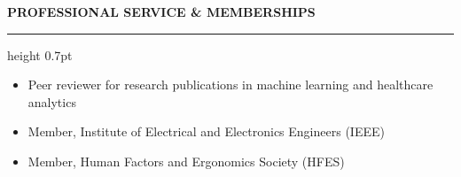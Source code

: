 \documentclass[11pt,letterpaper]{article}
\newcommand{\cvsection}[1]{%
  \vspace{0.7em}%
  {\color{headerblue}\large\bfseries\MakeUppercase{#1}}%
  \vspace{0.12em}%
  {\color{rulecolor}\hrule height 0.7pt}%
  \vspace{0.35em}%
}
\begin{document}
\cvsection{Professional Service \& Memberships}

\begin{itemize}[leftmargin=0.5cm, itemsep=0.05cm, topsep=0.06cm, label={\color{headerblue}\textbullet}]
  \item Peer reviewer for research publications in machine learning and healthcare analytics
  \item Member, Institute of Electrical and Electronics Engineers (IEEE)
  \item Member, Human Factors and Ergonomics Society (HFES)
\end{itemize}
\end{document}
